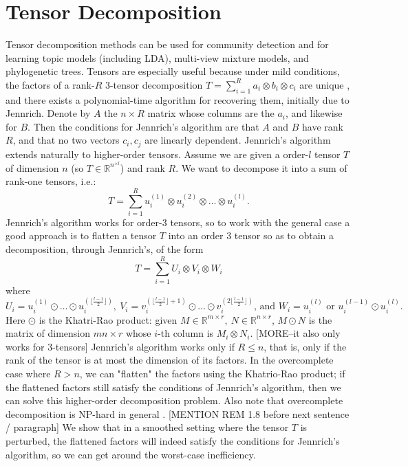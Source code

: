 \documentclass[11pt]{article}
\theoremstyle{definition}
\begin{document}
\section{Tensor Decomposition}
Tensor decomposition methods can be used for community detection and for learning  topic models (including LDA), multi-view mixture models, and phylogenetic trees. Tensors are especially useful because
under mild conditions, the factors of a rank-$R$ 3-tensor decomposition $T =
\sum_{i=1}^Ra_i \otimes b_i \otimes c_i$ are unique
\cite{tensorunique}, and there exists a polynomial-time algorithm for recovering them, initially due to Jennrich. Denote by $A$ the $n\times R$ matrix whose columns are the $a_i$, and likewise for $B$. Then the conditions for Jennrich's algorithm are that $A$ and $B$ have rank $R$, and that no two vectors $c_i, c_j$ are linearly dependent. Jennrich's algorithm extends naturally to higher-order tensors. Assume we are given a order-$l$ tensor $T$ of dimension $n$ (so $T\in \mathbb{R}^{n^{\times l}}$) and rank $R$. We want to decompose it into a sum of rank-one tensors, i.e.:
$$T = \sum_{i=1}^R u_i^{(1)}\otimes u_i^{(2)}\otimes\dots\otimes u_i^{(l)}.$$
Jennrich's algorithm works for order-$3$ tensors, so to work with the general case a good approach is to flatten a tensor $T$ into an order $3$ tensor so as to obtain a decomposition, through Jennrich's, of the form
$$T = \sum_{i=1}^R U_i\otimes V_i\otimes W_i$$
where
$$U_i=u_i^{(1)}\odot\dots\odot u_i^{(\lfloor\frac{l-1}{2}\rfloor)},\  V_i=v_i^{(\lfloor\frac{l-1}{2}\rfloor+1)}\odot\dots\odot v_i^{(2\lfloor\frac{l-1}{2}\rfloor)} \text{, and } W_i = u_i^{(l)}\text{ or }u_i^{(l-1)}\odot u_i^{(l)}.$$
Here $\odot$ is the Khatri-Rao product: given $M \in \mathbb{R}^{m\times r},\ N \in \mathbb{R}^{n\times r}$, $M\odot N$ is the matrix of dimension $mn\times r$ whose $i$-th column is $M_i\otimes N_i$.
[MORE--it also only works for 3-tensors] Jennrich's algorithm works only if $R \le n$, that is, only if the rank of the tensor is at most the dimension of its factors. In the overcomplete case where $R > n$, we can "flatten" the factors using the Khatrio-Rao product; if the flattened factors still satisfy the conditions of Jennrich's algorithm, then we can solve this higher-order decomposition problem. Also note that overcomplete decomposition is NP-hard in general \cite{tensorhard1} \cite{tensorhard2}. [MENTION REM 1.8 before next sentence / paragraph] We show that in a smoothed setting where the tensor $T$ is perturbed, the flattened factors will indeed satisfy the conditions for Jennrich's algorithm, so we can get around the worst-case inefficiency.
\end{document}
